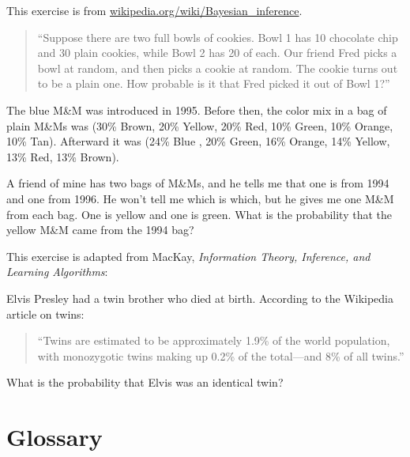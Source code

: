 \documentclass[12pt]{book}
\begin{document}
\begin{ex}

This exercise is from \url{wikipedia.org/wiki/Bayesian_inference}.

\begin{quote}

``Suppose there are two full bowls of cookies. Bowl 1 has 10 chocolate
  chip and 30 plain cookies, while Bowl 2 has 20 of each. Our friend
  Fred picks a bowl at random, and then picks a cookie at random. The
  cookie turns out to be a plain one. How probable is it that Fred
  picked it out of Bowl 1?''

\end{quote}

\end{ex}

\begin{ex}

The blue M\&M was introduced in 1995.  Before then, the color mix in
a bag of plain M\&Ms was (30\% Brown, 20\% Yellow, 20\% Red, 10\%
Green, 10\% Orange, 10\% Tan).  Afterward it was (24\% Blue , 20\%
Green, 16\% Orange, 14\% Yellow, 13\% Red, 13\% Brown).

A friend of mine has two bags of M\&Ms, and he tells me
that one is from 1994 and one from 1996.  He won't tell me which is
which, but he gives me one M\&M from each bag.  One is yellow and
one is green.  What is the probability that the yellow M\&M came
from the 1994 bag?
  
\end{ex}

\begin{ex}

This exercise is adapted from MacKay, {\em Information
  Theory, Inference, and Learning Algorithms}:

Elvis Presley had a twin brother who died at birth.  According to the
Wikipedia article on twins:

\begin{quote}
``Twins are estimated to be approximately 1.9\% of the world population,
with monozygotic twins making up 0.2\% of the total---and 8\% of all
twins.''
\end{quote}

What is the probability that Elvis was an identical twin?

\end{ex}


\section{Glossary}
\end{document}
